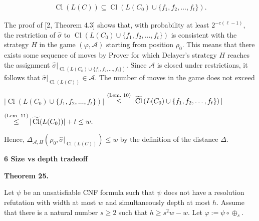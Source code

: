  
\[\begin{gathered}\operatorname{Cl}(L(C))\subseteq\operatorname{Cl}\left(L(C_{0})\cup\{f_{1},f_{2},\dots,f_{t}\}\right).\end{gathered}\] 
 




The proof of [2, Theorem 4.3] shows that, with probability at least $2^{-c(\ell-1)}$, the restriction of
$\hat{\sigma}$ to $\operatorname{Cl}(L(C_{0})\cup\{f_{1},f_{2},\dots,f_{t}\})$ is consistent with the strategy $H$ in the game
$(\varphi,\mathcal{A})$ starting from position $\rho_{0}$.
This means that there exists some sequence of moves by Prover for which Delayer’s strategy $H$ reaches the assignment
$\hat{\sigma}|_{\operatorname{Cl}(L(C_{0})\cup\{f_{1},f_{2},\dots,f_{t}\})}$.
Since $\mathcal{A}$ is closed under restrictions, it follows that $\hat{\sigma}|_{\operatorname{Cl}(L(C))}\in\mathcal{A}$.
The number of moves in the game does not exceed\par





 
$\displaystyle|\operatorname{Cl}\left(L(C_{0})\cup\{f_{1},f_{2},\dots,f_{t}\}\right)|$ 
$\displaystyle\mathop{\leq}^{\mbox{\scriptsize(Lem.\nobreak\ 10)}}|\operatorname{\widetilde{Cl}}\left(L(C_{0})\cup\{f_{1},f_{2},\dots,f_{t}\}\right)|$ 
 




 
 
$\displaystyle\mathop{\leq}^{\mbox{\scriptsize(Lem.\nobreak\ 11)}}|\operatorname{\widetilde{Cl}}(L(C_{0}))|+t\leq w.$ 
 




Hence, $\Delta_{\mathcal{A},H}(\rho_{0},\hat{\sigma}|_{\operatorname{Cl}(L(C))})\leq w$ by the definition of the distance $\Delta$.\par


\par\medskip\noindent\textbf{
6 Size vs depth tradeoff}\par


\par\medskip\noindent\textbf{
Theorem 25.
}\par



Let $\psi$ be an unsatisfiable CNF formula such that $\psi$ does not have a resolution
refutation with width at most $w$ and simultaneously depth at most $h$. Assume that there is a natural number $s\geq 2$ such that $h\geq s^{2}w-w$.
Let $\varphi:=\psi\circ\oplus_{s}$.\par




